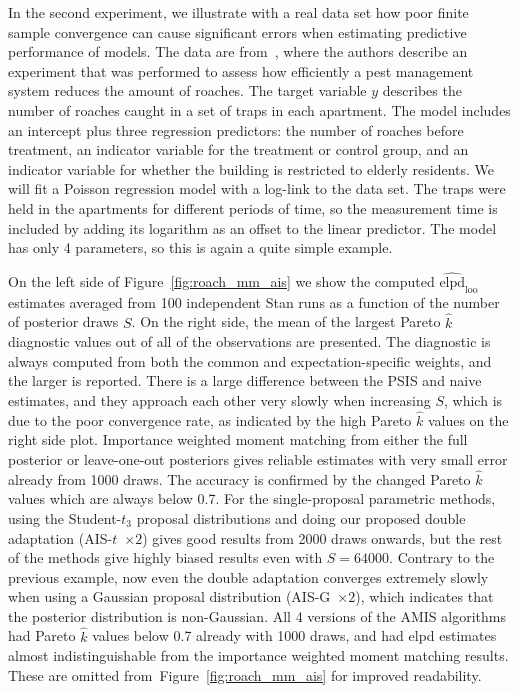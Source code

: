 \documentclass[12pt]{article}
\begin{document}
In the second experiment, we illustrate with a real data set
how poor finite sample convergence can cause significant errors when estimating predictive performance of models.
The data are from~\citet{gelman2006data}, where the authors describe an experiment that was performed to assess
how efficiently a pest management system reduces the amount of roaches. The target variable $y$ describes the number of roaches
caught in a set of traps in each apartment. The model includes an intercept plus three regression predictors: the number of roaches before treatment, an indicator variable for the treatment or control group, and an indicator variable for whether the building is restricted
to elderly residents.
We will fit a Poisson regression model with a log-link to the data set.
The traps were held in the apartments for different periods of time, so the measurement time is included by adding its logarithm as an offset to the linear predictor.
The model has only 4 parameters, so this is again a quite simple example.







%
%
%
On the left side of Figure~\ref{fig:roach_mm_ais} we show the computed $\widehat{\mathrm{elpd}}_{\mathrm{loo}}$
estimates averaged from 100 independent Stan runs as a function of the number of posterior draws $S$.
On the right side, the mean of the largest Pareto $\hat{k}$ diagnostic values out of all of the observations are presented.
The diagnostic is always computed from both
the common and expectation-specific weights, and the larger is reported.
There is a large difference between the PSIS and naive estimates, and they approach each other
very slowly
when increasing $S$, which is due to the poor convergence rate, as indicated by the high Pareto $\hat{k}$ values
on the right side plot.
Importance weighted moment matching from either the full posterior or
leave-one-out posteriors gives reliable estimates with very small error already from 1000 draws.
The accuracy is confirmed by the changed Pareto $\hat{k}$ values which are always below 0.7.
%
For the single-proposal parametric methods, using the Student-$t_3$ proposal distributions and doing our proposed double adaptation (AIS-$t$~$\times 2$)
gives good results from 2000 draws onwards, but the rest of the methods give highly biased results
even with $S = 64000$.
Contrary to the previous example, now even the double adaptation converges extremely slowly when using a Gaussian
proposal distribution (AIS-G~$\times 2$), which indicates that the posterior distribution is non-Gaussian.
All 4 versions of the AMIS algorithms had Pareto $\hat{k}$ values below 0.7 already with 1000 draws, and
had elpd estimates almost indistinguishable from the importance
weighted moment matching results. These are omitted from~Figure~\ref{fig:roach_mm_ais} for improved readability.
\end{document}

